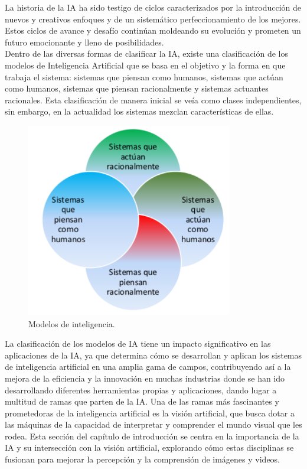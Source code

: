 La historia de la IA ha sido testigo de ciclos caracterizados por la introducción de nuevos y creativos enfoques y de un sistemático perfeccionamiento de los mejores. Estos ciclos de avance y desafío continúan moldeando su evolución y prometen un futuro emocionante y lleno de posibilidades.\\

Dentro de las diversas formas de clasificar la IA, existe una clasificación de los modelos de Inteligencia Artificial que se basa en el objetivo y la forma en que trabaja el sistema: sistemas que piensan como humanos, sistemas que actúan como humanos, sistemas que piensan racionalmente y sistemas actuantes racionales. Esta clasificación de manera inicial se veía como clases independientes, sin embargo, en la actualidad los sistemas mezclan características de ellas. \cite{Ponce14} \\

\begin{figure} [h!]
    \begin{center}
      \includegraphics[width=9cm]{figs/Modelos de inteligencia.png}
    \end{center}
    \caption{Modelos de inteligencia.}
    \label{fig:ModelosInteligencia}
\end{figure}

La clasificación de los modelos de IA tiene un impacto significativo en las aplicaciones de la IA, ya que determina cómo se desarrollan y aplican los sistemas de inteligencia artificial en una amplia gama de campos, contribuyendo así a la mejora de la eficiencia y la innovación en muchas industrias donde se han ido desarrollando diferentes herramientas propias y aplicaciones, dando lugar a multitud de ramas que parten de la IA. Una de las ramas más fascinantes y prometedoras de la inteligencia artificial es la visión artificial, que busca dotar a las máquinas de la capacidad de interpretar y comprender el mundo visual que les rodea. Esta sección del capítulo de introducción se centra en la importancia de la IA y su intersección con la visión artificial, explorando cómo estas disciplinas se fusionan para mejorar la percepción y la comprensión de imágenes y videos.

